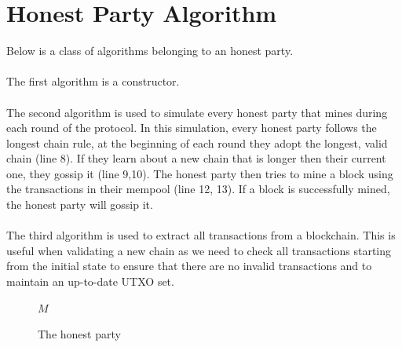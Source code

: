 \section{Honest Party Algorithm}
Below is a class of algorithms belonging to an honest party.
\\
\\
The first algorithm is a constructor.
\\
\\
The second algorithm is used to simulate every honest party that mines during each round of the protocol. In this simulation, every honest party follows the longest chain rule, at the beginning of each round they adopt the longest, valid chain (line 8). If they learn about a new chain that is longer then their current one, they gossip it (line 9,10). The honest party then tries to mine a block using the transactions in their mempool (line 12, 13). If a block is successfully mined, the honest party will gossip it.
\\
\\
The third algorithm is used to extract all transactions from a blockchain. This is useful when validating a new chain as we need to check all transactions starting from the initial state to ensure that there are no invalid transactions and to maintain an up-to-date UTXO set.
\begin{figure}[H]
\begin{algorithm}[H]
    \caption{\label{alg.backbone} The honest party}
    \begin{algorithmic}[1]
     \Statex
     \Let{\chain}{[\,]}
            \Let{\chain}{[\mathcal{G}]}
        \EndFunction
            \If{$\tilde\chain \neq \chain$}
                \Let{\chain}{\tilde\chain}
            \EndIf
             
             
                 
            \EndIf
            \State\Return$M$
        \EndFunction
                 
            \EndFor
            \State{}
        \EndFunction
        \vskip8pt
    \end{algorithmic}
\end{algorithm}
\end{figure}

